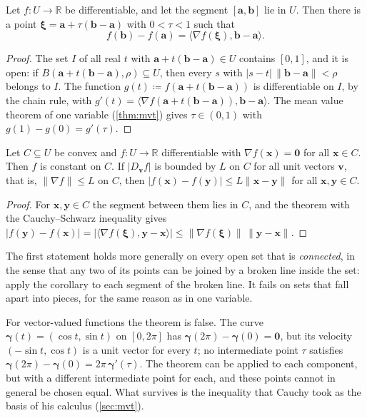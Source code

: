 \begin{theorem}
\label{thm:mvt-rn}
Let $f\colon U\to\mathbb R$ be differentiable, and let the segment $[\mathbf a,\mathbf b]$ lie in $U$. Then there is a point $\boldsymbol\xi=\mathbf a+\tau(\mathbf b-\mathbf a)$ with $0<\tau<1$ such that
\[
f(\mathbf b)-f(\mathbf a)=\bigl\langle\nabla f(\boldsymbol\xi),\mathbf b-\mathbf a\bigr\rangle .
\]
\end{theorem}

\begin{proof}
The set $I$ of all real $t$ with $\mathbf a+t(\mathbf b-\mathbf a)\in U$ contains $[0,1]$, and it is open: if $B(\mathbf a+t(\mathbf b-\mathbf a),\rho)\subseteq U$, then every $s$ with $|s-t|\,\|\mathbf b-\mathbf a\|<\rho$ belongs to $I$. The function $g(t)\coloneqq f(\mathbf a+t(\mathbf b-\mathbf a))$ is differentiable on $I$, by the chain rule, with $g'(t)=\langle\nabla f(\mathbf a+t(\mathbf b-\mathbf a)),\mathbf b-\mathbf a\rangle$. The mean value theorem of one variable (\cref{thm:mvt}) gives $\tau\in(0,1)$ with $g(1)-g(0)=g'(\tau)$.
\end{proof}

\begin{corollary}
\label{cor:zero-gradient}
Let $C\subseteq U$ be convex and $f\colon U\to\mathbb R$ differentiable with $\nabla f(\mathbf x)=\mathbf0$ for all $\mathbf x\in C$. Then $f$ is constant on $C$. If $|D_{\mathbf v}f|$ is bounded by $L$ on $C$ for all unit vectors $\mathbf v$, that is, $\|\nabla f\|\le L$ on $C$, then $|f(\mathbf x)-f(\mathbf y)|\le L\|\mathbf x-\mathbf y\|$ for all $\mathbf x,\mathbf y\in C$.
\end{corollary}

\begin{proof}
For $\mathbf x,\mathbf y\in C$ the segment between them lies in $C$, and the theorem with the Cauchy--Schwarz inequality gives $|f(\mathbf y)-f(\mathbf x)|=|\langle\nabla f(\boldsymbol\xi),\mathbf y-\mathbf x\rangle|\le\|\nabla f(\boldsymbol\xi)\|\,\|\mathbf y-\mathbf x\|$.
\end{proof}

The first statement holds more generally on every open set that is \emph{connected}, in the sense that any two of its points can be joined by a broken line inside the set: apply the corollary to each segment of the broken line. It fails on sets that fall apart into pieces, for the same reason as in one variable.

For vector-valued functions the theorem is false. The curve $\boldsymbol\gamma(t)=(\cos t,\sin t)$ on $[0,2\pi]$ has $\boldsymbol\gamma(2\pi)-\boldsymbol\gamma(0)=\mathbf0$, but its velocity $(-\sin t,\cos t)$ is a unit vector for every $t$; no intermediate point $\tau$ satisfies $\boldsymbol\gamma(2\pi)-\boldsymbol\gamma(0)=2\pi\,\boldsymbol\gamma'(\tau)$. The theorem can be applied to each component, but with a different intermediate point for each, and these points cannot in general be chosen equal. What survives is the inequality that Cauchy took as the basis of his calculus (\cref{sec:mvt}).

